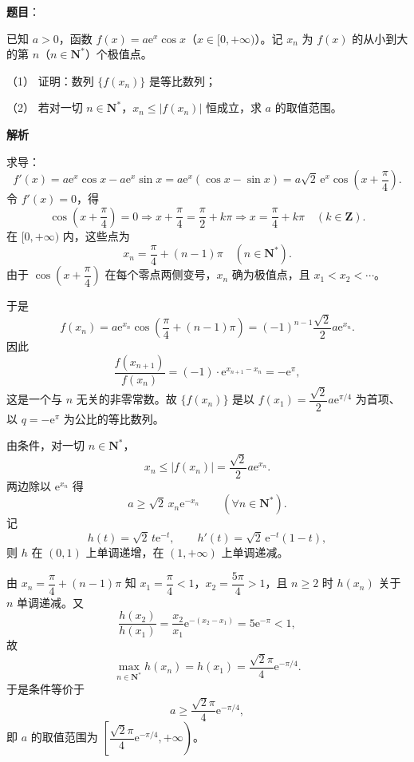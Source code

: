 \begin{answer}

\textbf{题目}：

已知 \(a>0\)，函数 \(f(x)=a\mathrm{e}^x\cos x\)（\(x\in[0,+\infty)\)）。记 \(x_n\) 为 \(f(x)\) 的从小到大的第 \(n\)（\(n\in\mathbf{N}^*\)）个极值点。

（1） 证明：数列 \(\{f(x_n)\}\) 是等比数列；

（2） 若对一切 \(n\in\mathbf{N}^*\)，\(x_n\leqslant|f(x_n)|\) 恒成立，求 \(a\) 的取值范围。

\textbf{解析}


求导：
\nopagebreak[4]
\[
f'(x)=a\mathrm{e}^x\cos x-a\mathrm{e}^x\sin x
=a\mathrm{e}^x(\cos x-\sin x)
=a\sqrt2\,\mathrm{e}^x\cos\left(x+\dfrac{\pi}{4}\right).
\]
令 \(f'(x)=0\)，得
\nopagebreak[4]
\[
\cos\left(x+\dfrac{\pi}{4}\right)=0
\Longrightarrow x+\dfrac{\pi}{4}=\dfrac{\pi}{2}+k\pi
\Longrightarrow x=\dfrac{\pi}{4}+k\pi\quad(k\in\mathbf{Z}).
\]
在 \([0,+\infty)\) 内，这些点为
\nopagebreak[4]
\[
x_n=\dfrac{\pi}{4}+(n-1)\pi\quad(n\in\mathbf{N}^*).
\]
由于 \(\cos\left(x+\dfrac{\pi}{4}\right)\) 在每个零点两侧变号，\(x_n\) 确为极值点，且 \(x_1<x_2<\cdots\)。

于是
\nopagebreak[4]
\[
f(x_n)=a\mathrm{e}^{x_n}\cos\left(\dfrac{\pi}{4}+(n-1)\pi\right)
=(-1)^{n-1}\dfrac{\sqrt2}{2}a\mathrm{e}^{x_n}.
\]
因此
\nopagebreak[4]
\[
\dfrac{f(x_{n+1})}{f(x_n)}
=(-1)\cdot\mathrm{e}^{x_{n+1}-x_n}
=-\mathrm{e}^{\pi},
\]
这是一个与 \(n\) 无关的非零常数。故 \(\{f(x_n)\}\) 是以 \(f(x_1)=\dfrac{\sqrt2}{2}a\mathrm{e}^{\pi/4}\) 为首项、以 \(q=-\mathrm{e}^{\pi}\) 为公比的等比数列。


由条件，对一切 \(n\in\mathbf{N}^*\)，
\nopagebreak[4]
\[
x_n\leqslant|f(x_n)|=\dfrac{\sqrt2}{2}a\mathrm{e}^{x_n}.
\]
两边除以 \(\mathrm{e}^{x_n}\) 得
\nopagebreak[4]
\[
a\geqslant\sqrt2\,x_n\mathrm{e}^{-x_n}\qquad(\forall n\in\mathbf{N}^*).
\]
记
\nopagebreak[4]
\[
h(t)=\sqrt2\,t\mathrm{e}^{-t},\qquad h'(t)=\sqrt2\,\mathrm{e}^{-t}(1-t),
\]
则 \(h\) 在 \((0,1)\) 上单调递增，在 \((1,+\infty)\) 上单调递减。

由 \(x_n=\dfrac{\pi}{4}+(n-1)\pi\) 知 \(x_1=\dfrac{\pi}{4}<1\)，\(x_2=\dfrac{5\pi}{4}>1\)，且 \(n\geqslant2\) 时 \(h(x_n)\) 关于 \(n\) 单调递减。又
\nopagebreak[4]
\[
\dfrac{h(x_2)}{h(x_1)}=\dfrac{x_2}{x_1}\mathrm{e}^{-(x_2-x_1)}=5\mathrm{e}^{-\pi}<1,
\]
故
\nopagebreak[4]
\[
\max_{n\in\mathbf{N}^*}h(x_n)=h(x_1)=\dfrac{\sqrt2\pi}{4}\mathrm{e}^{-\pi/4}.
\]
于是条件等价于
\nopagebreak[4]
\[
a\geqslant\dfrac{\sqrt2\pi}{4}\mathrm{e}^{-\pi/4},
\]
即 \(a\) 的取值范围为 \(\left[\dfrac{\sqrt2\pi}{4}\mathrm{e}^{-\pi/4},+\infty\right)\)。


\end{answer}
